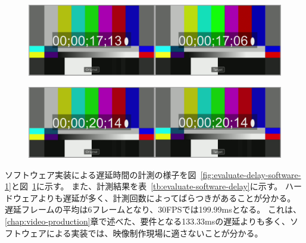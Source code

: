 \begin{figure}[htbp]
  \begin{center}
    \includegraphics[bb=0 0 1920 540,width=14cm]{img/evaluate-delay-software-2.png}
  \end{center}
  \caption[ソフトウェア実装による4回目の遅延計測のキャプチャー画像]{}
  \label{fig:evaluate-delay-software-2}
\end{figure}

\begin{figure}[htbp]
  \begin{center}
    \includegraphics[bb=0 0 1920 540,width=14cm]{img/evaluate-delay-hardware.png}
  \end{center}
  \caption[ハードウェア実装による遅延計測のキャプチャー画像]{}
  \label{fig:evaluate-delay-hardware}
\end{figure}


ソフトウェア実装による遅延時間の計測の様子を図~\ref{fig:evaluate-delay-software-1}と図~\ref{fig:evaluate-delay-software-2}に示す。
また、計測結果を表~\ref{tb:evaluate-software-delay}に示す。
ハードウェアよりも遅延が多く、計測回数によってばらつきがあることが分かる。
遅延フレームの平均は6フレームとなり、30FPSでは199.99msとなる。
これは、\ref{chap:video-production}章で述べた、要件となる133.33msの遅延よりも多く、ソフトウェアによる実装では、映像制作現場に適さないことが分かる。

